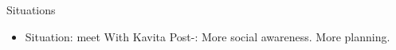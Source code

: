 \begin{columns}
\begin{column}{0.25\linewidth}
      \begin{block}{Situations}
        \begin{itemize}
          \tiny \item \tiny Situation: meet With Kavita  Post-: More
          social awareness. More planning.
        \end{itemize}
      \end{block}
    \end{column}
  \end{columns}


